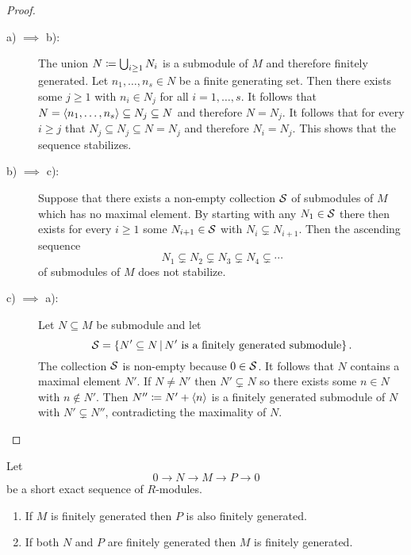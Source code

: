 \begin{proof}
  \leavevmode
  \begin{description}
    \item[a) $\implies$ b):]
      The union $N \coloneqq \bigcup_{i \geq 1} N_i$ is a submodule of $M$ and therefore finitely generated.
      Let $n_1, \dotsc, n_s \in N$ be a finite generating set.
      Then there exists some $j \geq 1$ with $n_i \in N_j$ for all $i = 1, \dotsc, s$.
      It follows that $N = \left\langle n_1, \dotsc, n_s \right\rangle \subseteq N_j \subseteq N$ and therefore $N = N_j$.
      It follows that for every $i \geq j$ that $N_j \subseteq N_j \subseteq N = N_j$ and therefore $N_i = N_j$.
      This shows that the sequence stabilizes.
    \item[b) $\implies$ c):]
      Suppose that there exists a non-empty collection $\mathcal{S}$ of submodules of $M$ which has no maximal element.
      By starting with any $N_1 \in \mathcal{S}$ there then exists for every $i \geq 1$ some $N_{i+1} \in \mathcal{S}$ with $N_i \subsetneq N_{i+1}$.
      Then the ascending sequence
      \[
                    N_1
        \subsetneq  N_2
        \subsetneq  N_3
        \subsetneq  N_4
        \subsetneq  \dotsb
      \]
      of submodules of $M$ does not stabilize.
    \item[c) $\implies$ a):]
      Let $N \subseteq M$ be submodule and let
      \[
          \mc{S}
        = \{
            N' \subseteq N
          \suchthat
            \text{$N'$ is a finitely generated submodule}
          \} \,.
      \]
      The collection $\mathcal{S}$ is non-empty because $0 \in \mathcal{S}$.
      It follows that $N$ contains a maximal element $N'$.
      If $N \neq N'$ then $N' \subsetneq N$ so there exists some $n \in N$ with $n \notin N'$.
      Then $N'' \coloneqq N' + \left\langle n \right\rangle$ is a finitely generated submodule of $N$ with $N' \subsetneq N''$, contradicting the maximality of $N$.
    \qedhere
  \end{description}
\end{proof}


\begin{lemma}
  \label{lemma: finitely generated under ses}
  Let
  \[
        0
    \to N
    \to M
    \to P
    \to 0
  \]
  be a short exact sequence of $R$-modules.
  \begin{enumerate}
    \item
      If $M$ is finitely generated then $P$ is also finitely generated.
    \item
      If both $N$ and $P$ are finitely generated then $M$ is finitely generated.
  \end{enumerate}
\end{lemma}


